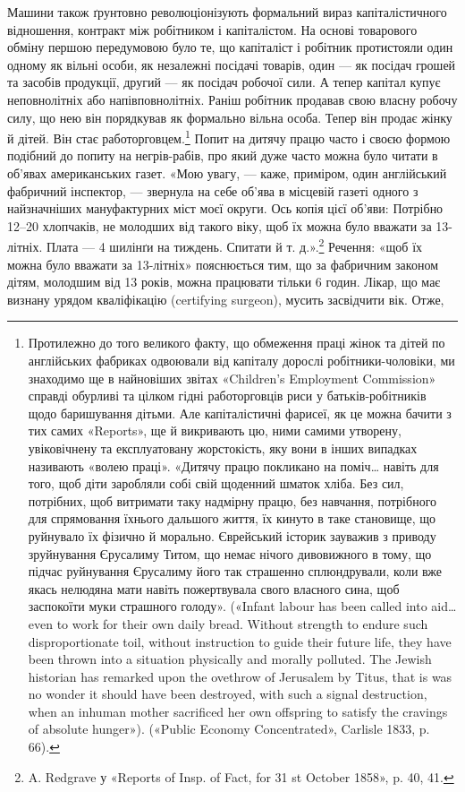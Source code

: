 Машини також ґрунтовно революціонізують формальний вираз
капіталістичного відношення, контракт між робітником і капіталістом.
На основі товарового обміну першою передумовою було
те, що капіталіст і робітник протистояли один одному як вільні
особи, як незалежні посідачі товарів, один — як посідач грошей
та засобів продукції, другий — як посідач робочої сили. А тепер
капітал купує неповнолітніх або напівповнолітніх. Раніш
робітник продавав свою власну робочу силу, що нею він порядкував
як формально вільна особа. Тепер він продає жінку
й дітей. Він стає работорговцем.\footnote{
Протилежно до того великого факту, що обмеження праці жінок
та дітей по англійських фабриках одвоювали від капіталу дорослі робітники-чоловіки,
ми знаходимо ще в найновіших звітах «Children’s Employment
Commission» справді обурливі та цілком гідні работорговців риси
у батьків-робітників щодо баришування дітьми. Але капіталістичні
фарисеї, як це можна бачити з тих самих «Reports», ще й викривають цю,
ними самими утворену, увіковічнену та експлуатовану жорстокість, яку
вони в інших випадках називають «волею праці». «Дитячу працю покликано
на поміч\dots{} навіть для того, щоб діти заробляли собі свій щоденний
шматок хліба. Без сил, потрібних, щоб витримати таку надмірну
працю, без навчання, потрібного для спрямовання їхнього дальшого життя,
їх кинуто в таке становище, що руйнувало їх фізично й морально. Єврейський
історик зауважив з приводу зруйнування Єрусалиму Титом, що
немає нічого дивовижного в тому, що підчас руйнування Єрусалиму його
так страшенно сплюндрували, коли вже якась нелюдяна мати навіть пожертвувала
свого власного сина, щоб заспокоїти муки страшного голоду».
(«Infant labour has been called into aid\dots{} even to work for their own daily
bread. Without strength to endure such disproportionate toil, without
instruction to guide their future life, they have been thrown into a situation
physically and morally polluted. The Jewish historian has remarked upon
the ovethrow of Jerusalem by Titus, that is was no wonder it should have
been destroyed, with such a signal destruction, when an inhuman mother
sacrificed her own offspring to satisfy the cravings of absolute hunger»).
(«Public Economy Concentrated», Carlisle 1833, p. 66).
} Попит на дитячу працю
часто і своєю формою подібний до попиту на негрів-рабів,
про який дуже часто можна було читати в об’явах американських
газет. «Мою увагу, — каже, приміром, один англійський
фабричний інспектор, — звернула на себе об’ява в місцевій
газеті одного з найзначніших мануфактурних міст моєї округи.
Ось копія цієї об’яви: Потрібно 12--20 хлопчаків, не молодших
від такого віку, щоб їх можна було вважати за 13-літніх.
Плата — 4 шилінґи на тиждень. Спитати й т. д.».\footnote{
A. Redgrave у «Reports of Insp. of Fact, for 31 st October
1858», p. 40, 41.
} Речення:
«щоб їх можна було вважати за 13-літніх» пояснюється тим, що
за фабричним законом дітям, молодшим від 13 років, можна
працювати тільки 6 годин. Лікар, що має визнану урядом кваліфікацію
(certifying surgeon), мусить засвідчити вік. Отже,

